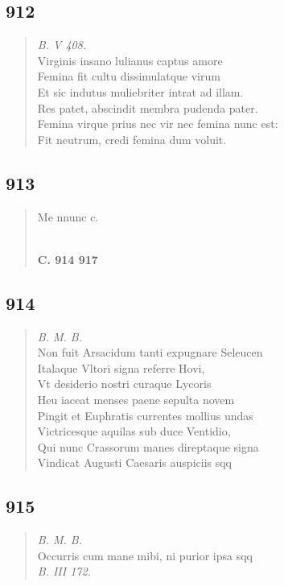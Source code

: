 \documentclass[11pt, a4paper]{report}
\begin{document}
            \subsection*{912}
      \begin{verse}
      \textit{B. V 408.} \\ Virginis insano lulianus captus amore \\ Femina fit cultu dissimulatque virum \\ Et sic indutus muliebriter intrat ad illam. \\ Res patet, abscindit membra pudenda pater. \\ Femina virque prius nec vir nec femina nunc est: \\ Fit neutrum, credi femina dum voluit. \\ 
      \end{verse}
  
            \subsection*{913}
      \begin{verse}
      Me nnunc c. \\ 
        ﻿\pagebreak 
    \begin{center} \textbf{C. 914 917} \end{center} \marginpar{[343]} 
      \end{verse}
  
            \subsection*{914}
      \begin{verse}
      \textit{B. M. B.} \\ Non fuit Arsacidum tanti expugnare Seleucen \\ Italaque Vltori signa referre Hovi, \\ Vt desiderio nostri curaque Lycoris \\ Heu iaceat menses paene sepulta novem \\ Pingit et Euphratis currentes mollius undas \\ Victricesque aquilas sub duce Ventidio, \\ Qui nunc Crassorum manes direptaque signa \\ Vindicat Augusti Caesaris auspiciis sqq \\ 
      \end{verse}
  
            \subsection*{915}
      \begin{verse}
      \textit{B. M. B.} \\ Occurris cum mane mibi, ni purior ipsa sqq \\ \textit{B. III 172.} \\ 
      \end{verse}
  
\end{document}
